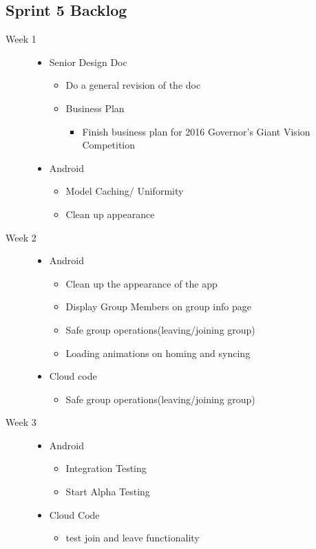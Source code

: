 \subsection{Sprint 5 Backlog}
\begin{description}
	\item[Week 1] \hfill
		\begin{itemize}
		\item Senior Design Doc
		\begin{itemize}
			\item Do a general revision of the doc
		\end{itemize}
		\begin{itemize}
		\item Business Plan
			\begin{itemize}
			\item Finish business plan for 2016 Governor's Giant Vision Competition
			\end{itemize}
		\end{itemize}
		\item Android
		\begin{itemize}
			\item Model Caching/ Uniformity
			\item Clean up appearance
		\end{itemize}
	\end{itemize}
	
  \item[Week 2] \hfill
		\begin{itemize}
		\item Android
		\begin{itemize}
			\item Clean up the appearance of the app
			\item Display Group Members on group info page
			\item Safe group operations(leaving/joining group)
			\item Loading animations on homing and syncing
		\end{itemize}
		\item Cloud code
		\begin{itemize}
			\item Safe group operations(leaving/joining group)
		\end{itemize}
	\end{itemize}
  
  \item[Week 3] \hfill
		\begin{itemize}
		\item Android
		\begin{itemize}
			\item Integration Testing
			\item Start Alpha Testing
		\end{itemize}
		\item Cloud Code
		\begin{itemize}
			\item test join and leave functionality
		\end{itemize}
	\end{itemize}
\end{description}
